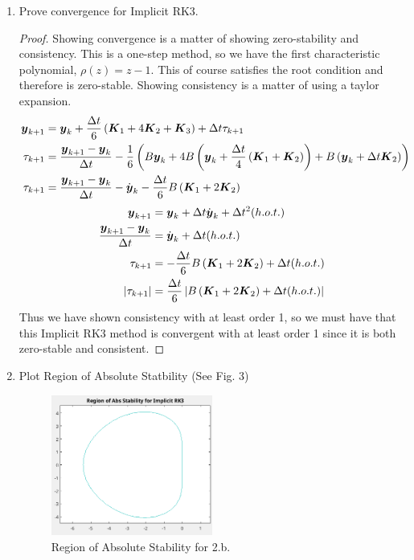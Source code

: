 \documentclass{article}
\begin{document}
\begin{enumerate}[label=\alph*)]

    \item Prove convergence for Implicit RK3.
    \begin{proof}
        Showing convergence is a matter of showing zero-stability and
        consistency. This is a one-step method, so we have the first
        characteristic polynomial, $\rho(z) = z - 1$. This of course satisfies
        the root condition and therefore is zero-stable. Showing consistency is
        a matter of using a taylor expansion. 
        \begin{align*}
            \boldsymbol{y}_{k+1}&=\boldsymbol{y}_k + \frac{\Delta t}{6}\left(\boldsymbol{K}_1 + 4\boldsymbol{K}_2 +
            \boldsymbol{K}_3\right) + \Delta t\tau_{k+1}\\
            \tau_{k+1}&=\frac{\boldsymbol{y}_{k+1}-\boldsymbol{y}_k}{\Delta t} -
            \frac{1}{6}\left(B\boldsymbol{y}_k + 4B\left(\boldsymbol{y}_k +
            \frac{\Delta t}{4}\left(\boldsymbol{K}_1 + \boldsymbol{K}_2\right)\right) 
            +B\left(\boldsymbol{y}_k + \Delta t\boldsymbol{K}_2\right)\right)\\
            \tau_{k+1}&=\frac{\boldsymbol{y}_{k+1}-\boldsymbol{y}_k}{\Delta t} - \dot{\boldsymbol{y}}_k -
            \frac{\Delta t}{6}B\left(\boldsymbol{K}_1 + 2\boldsymbol{K}_2\right)
        \end{align*}
        \begin{align*}
            \boldsymbol{y}_{k+1} &= \boldsymbol{y}_k + \Delta t\dot{\boldsymbol{y}}_k + \Delta t^2(h.o.t.)\\
            \frac{\boldsymbol{y}_{k+1}-\boldsymbol{y}_k}{\Delta t} &=  \dot{\boldsymbol{y}}_k + \Delta t(h.o.t.)\\
            \tau_{k+1}&= -\frac{\Delta t}{6}B\left(\boldsymbol{K}_1 + 2\boldsymbol{K}_2\right) +
            \Delta t(h.o.t.)\\
            |\tau_{k+1}|&= \frac{\Delta t}{6}\left|B\left(\boldsymbol{K}_1 + 2\boldsymbol{K}_2\right) +
            \Delta t(h.o.t.)\right|\\
        \end{align*}
        Thus we have shown consistency with at least order 1, so we must have
        that this Implicit RK3 method is convergent with at least order 1 since
        it is both zero-stable and consistent. 
    \end{proof}

    \item Plot Region of Absolute Statbility (See Fig. 3)
    \begin{figure}[ht]
        \centering 
        \includegraphics[width=0.5\textwidth]{2.b.AbsStab'.png}
        \caption{Region of Absolute Stability for 2.b.}
    \end{figure}


\end{enumerate}
\end{document}
